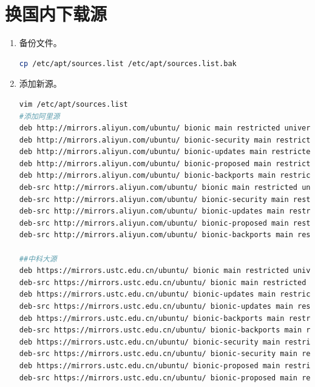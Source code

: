 \documentclass[12pt,twoside]{report}
\begin{document}
\section{换国内下载源}

\begin{enumerate}
    \item 备份文件。
    \begin{lstlisting}[language=sh]
        cp /etc/apt/sources.list /etc/apt/sources.list.bak
    \end{lstlisting}

    \item 添加新源。
    \begin{lstlisting}[language=sh]
vim /etc/apt/sources.list
#添加阿里源
deb http://mirrors.aliyun.com/ubuntu/ bionic main restricted universe multiverse
deb http://mirrors.aliyun.com/ubuntu/ bionic-security main restricted universe multiverse
deb http://mirrors.aliyun.com/ubuntu/ bionic-updates main restricted universe multiverse
deb http://mirrors.aliyun.com/ubuntu/ bionic-proposed main restricted universe multiverse
deb http://mirrors.aliyun.com/ubuntu/ bionic-backports main restricted universe multiverse
deb-src http://mirrors.aliyun.com/ubuntu/ bionic main restricted universe multiverse
deb-src http://mirrors.aliyun.com/ubuntu/ bionic-security main restricted universe multiverse
deb-src http://mirrors.aliyun.com/ubuntu/ bionic-updates main restricted universe multiverse
deb-src http://mirrors.aliyun.com/ubuntu/ bionic-proposed main restricted universe multiverse
deb-src http://mirrors.aliyun.com/ubuntu/ bionic-backports main restricted universe multiverse

##中科大源
deb https://mirrors.ustc.edu.cn/ubuntu/ bionic main restricted universe multiverse
deb-src https://mirrors.ustc.edu.cn/ubuntu/ bionic main restricted universe multiverse
deb https://mirrors.ustc.edu.cn/ubuntu/ bionic-updates main restricted universe multiverse
deb-src https://mirrors.ustc.edu.cn/ubuntu/ bionic-updates main restricted universe multiverse
deb https://mirrors.ustc.edu.cn/ubuntu/ bionic-backports main restricted universe multiverse
deb-src https://mirrors.ustc.edu.cn/ubuntu/ bionic-backports main restricted universe multiverse
deb https://mirrors.ustc.edu.cn/ubuntu/ bionic-security main restricted universe multiverse
deb-src https://mirrors.ustc.edu.cn/ubuntu/ bionic-security main restricted universe multiverse
deb https://mirrors.ustc.edu.cn/ubuntu/ bionic-proposed main restricted universe multiverse
deb-src https://mirrors.ustc.edu.cn/ubuntu/ bionic-proposed main restricted universe multiverse


\end{lstlisting}
\end{enumerate}
\end{document}
